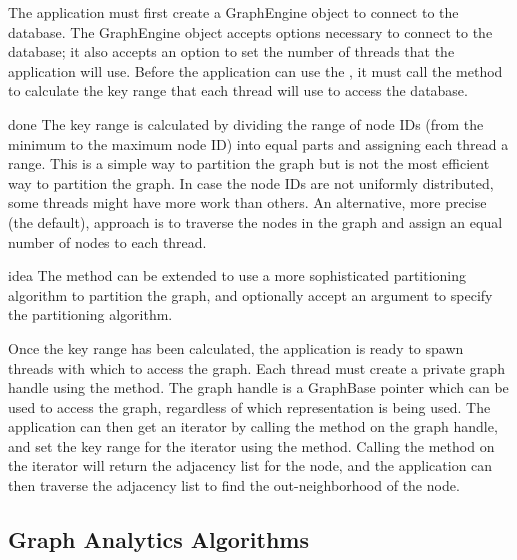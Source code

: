 The application must first create a GraphEngine object to connect to the database.
The GraphEngine object accepts options necessary to connect to the database; it also accepts an option to set the number of threads that the application will use.
Before the application can use the \api{}, it must call the  method to calculate the key range that each thread will use to access the database.
\begin{statusbar}{done}
The key range is calculated by dividing the range of node IDs (from the minimum to the maximum node ID) into equal parts and assigning each thread a range.
This is a simple way to partition the graph but is not the most efficient way to partition the graph.
In case the node IDs are not uniformly distributed, some threads might have more work than others.
An alternative, more precise (the default), approach is to traverse the nodes in the graph and assign an equal number of nodes to each thread.
\end{statusbar}
\begin{statusbar}{idea}
  The  method can be extended to use a more sophisticated partitioning algorithm to partition the graph, and optionally accept an argument to specify the partitioning algorithm.
\end{statusbar}

Once the key range has been calculated, the application is ready to spawn threads with which to access the graph.
Each thread must create a private graph handle using the  method.
The graph handle is a GraphBase pointer which can be used to access the graph, regardless of which representation is being used.
The application can then get an iterator by calling the  method on the graph handle, and set the key range for the iterator using the  method.
Calling the  method on the iterator will return the adjacency list for the node, and the application can then traverse the adjacency list to find the out-neighborhood of the node.

\subsection{Graph Analytics Algorithms}
\label{arch:graph-algos}

